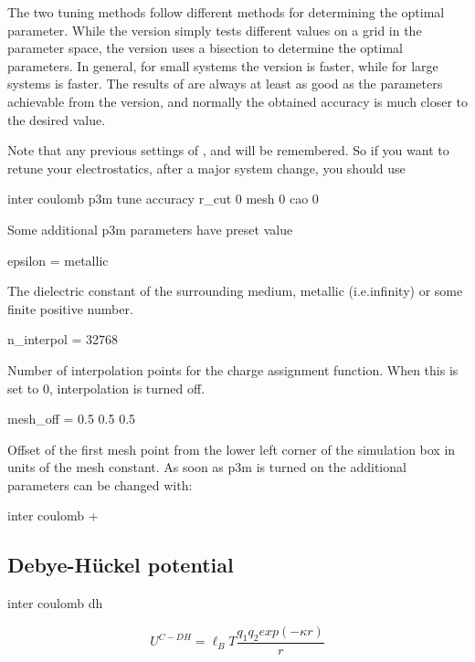 The two tuning methods follow different methods for determining the
optimal parameter. While the  version simply tests
different values on a grid in the parameter space, the
 version uses a bisection to determine the optimal
parameters. In general, for small systems the  version
is faster, while for large systems  is faster. The
results of  are always at least as good as the
parameters achievable from the  version, and normally
the obtained accuracy is much closer to the desired value.

Note that any previous settings of ,  and
 will be remembered. So if you want to retune your
electrostatics, \eg after a major system change, you should use
\begin{code}
inter coulomb  p3m tune accuracy  r_cut 0 mesh 0 cao 0
\end{code}
Some additional p3m parameters have preset value
\begin{tclcode}
 epsilon = metallic 
\end{tclcode}
The dielectric constant of the surrounding medium, metallic
(i.e.infinity) or some finite positive number.
\begin{tclcode}
 n_interpol = 32768 
\end{tclcode}
Number of interpolation points for the charge assignment function.
When this is set to 0, interpolation is turned off.
\begin{tclcode}
 mesh_off = 0.5 0.5 0.5 
\end{tclcode}
Offset of the first mesh point from the lower left corner of the
simulation box in units of the mesh constant. As soon as p3m is turned
on the additional parameters can be changed with:
\begin{code}
inter coulomb  +
\end{code}


\subsection{Debye-H\"uckel potential}

\begin{essyntax}
  inter coulomb dh  
\end{essyntax}
\[ U^{C-DH} = \ell_B T \frac{q_1 q_2 exp(-\kappa r)}{r} \]

